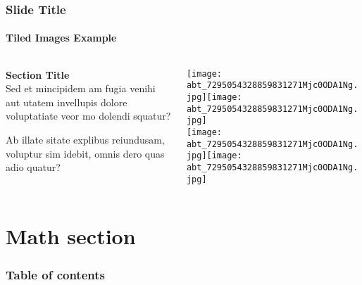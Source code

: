 \documentclass[
	aspectratio=169, %
	t, %
	onlytextwidth, %
	10pt, %
]{beamer}
\begin{document}

\begin{frame}
	\frametitle{Slide Title}
	\framesubtitle{Tiled Images Example}
	
	\small %
	
	\begin{columns}[T] %
		\begin{column}{0.3\linewidth} %
			\textbf{Section Title}\\
			Sed et mincipidem am fugia venihi aut utatem invellupis dolore voluptatiate veor mo dolendi squatur?

			Ab illate sitate explibus reiundusam, voluptur sim idebit, omnis dero quas adio quatur?
		\end{column}
		\begin{column}{0.68\linewidth} %
			\vspace{-3.5\baselineskip} %
			
			\texttt{[image: abt\_7295054328859831271Mjc0ODA1Ng.jpg]}\hfill\texttt{[image: abt\_7295054328859831271Mjc0ODA1Ng.jpg]}\\[4pt]
			\texttt{[image: abt\_7295054328859831271Mjc0ODA1Ng.jpg]}\hfill\texttt{[image: abt\_7295054328859831271Mjc0ODA1Ng.jpg]}\par
		\end{column}
	\end{columns}
\end{frame}



\section{Math section}

\begin{frame}
    \frametitle{Table of contents}
    \tableofcontents[currentsection]
\end{frame}
\end{document}
